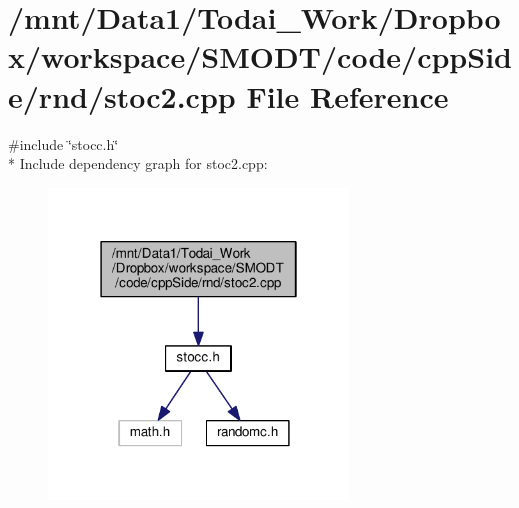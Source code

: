 \section{/mnt/\-Data1/\-Todai\-\_\-\-Work/\-Dropbox/workspace/\-S\-M\-O\-D\-T/code/cpp\-Side/rnd/stoc2.cpp File Reference}
\label{rnd_2stoc2_8cpp}
{\ttfamily \#include \char`\"{}stocc.\-h\char`\"{}}\\*
Include dependency graph for stoc2.\-cpp\-:\nopagebreak
\begin{figure}[H]
\begin{center}
\leavevmode
\includegraphics[width=226pt]{rnd_2stoc2_8cpp__incl}
\end{center}
\end{figure}
